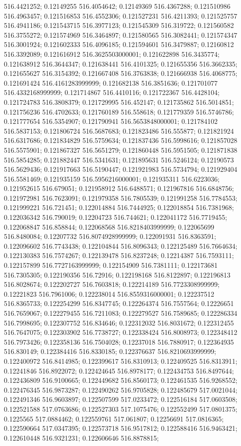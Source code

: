 516.4421252; 0.12149255 516.4054642; 0.12149369 516.4367288; 0.121510986 516.4963457; 0.121516853 516.4552306; 0.121527231 516.4211393; 0.121525757 516.4941186; 0.121543715 516.3977123; 0.121545309 516.319722; 0.121560582 516.3755272; 0.121574969 516.3464897; 0.121580565 516.3082441; 0.121574347 516.3001924; 0.121602333 516.4096185; 0.121594601 516.3479887; 0.12160812 516.3392089; 0.121616912 516.3625503000001; 0.121622898 516.3435774; 0.121638912 516.3644347; 0.121638441 516.4101325; 0.121655356 516.3662335; 0.121655627 516.3154392; 0.121667408 516.3763838; 0.121666938 516.4068775; 0.121691424 516.4161283999999; 0.121682138 516.3851636; 0.121701077 516.4332168999999; 0.121714867 516.4410116; 0.121722367 516.4428104; 0.121724783 516.3808379; 0.121729995 516.452147; 0.121735862 516.5014851; 0.121756236 516.4702633; 0.121760189 516.558618; 0.121779359 516.5746786; 0.121777654 516.5354907; 0.121790941 516.5653848000001; 0.121784102 516.5837153; 0.121806724 516.5687683; 0.121823486 516.555877; 0.121821924 516.6317686; 0.121834829 516.5759634; 0.121837436 516.5998616; 0.121857028 516.5575901; 0.121867327 516.5651279; 0.121860448 516.5951505; 0.121871838 516.5854285; 0.121882447 516.5341631; 0.121895631 516.5246124; 0.12190573 516.5629436; 0.121917663 516.5190447; 0.121921983 516.5734794; 0.121929404 516.5581469; 0.121935159 516.5956216000001; 0.121935311 516.6223036; 0.121952615 516.679051; 0.121958912 516.6488571; 0.121967816 516.6848756; 0.121972981 516.7623091; 0.121979358 516.7805539; 0.121991258 516.7784553; 0.121999221 516.721451; 0.122014884 516.7444925; 0.122018854 516.7381968; 0.122036342 516.790019; 0.12204723 516.744621; 0.122041172 516.7719455; 0.122068847 516.858844; 0.122068568 516.8218403999999; 0.122065699 516.8480084; 0.12207732 516.8074928999999; 0.122091931 516.8363591; 0.122096602 516.7743438; 0.122104844 516.8096343; 0.122125489 516.7664634; 0.122130383 516.7574267; 0.122139478 516.8237248; 0.12214387 516.7593111; 0.122157899 516.7727163999999; 0.122154909 516.7381111; 0.122173681 516.7305305; 0.122190356 516.72916; 0.122198168 516.8122897; 0.122196813 516.8028674; 0.122202727 516.7603818; 0.122214189 516.7723308999999; 0.12221823 516.7961006; 0.122238014 516.8559316000001; 0.122237512 516.8365733; 0.122254299 516.8347745; 0.122264374 516.7557564; 0.12226651 516.7659067; 0.122279455 516.7211083; 0.122279527 516.7589685; 0.122286334 516.7998695; 0.122307752 516.834646; 0.122312032 516.8031672; 0.122312455 516.7647075; 0.122303902 516.7738727; 0.122338424 516.8008973; 0.122348412 516.7973426; 0.122358136 516.7504028; 0.12237018 516.7880917; 0.122364935 516.830149; 0.122384416 516.8330185; 0.122376637 516.8210693999999; 0.122400972 516.8414985; 0.122399617 516.8310913; 0.122409525 516.8313911; 0.12241846 516.8922072; 0.122424645 516.8978177; 0.122434753 516.8497644; 0.122436809 516.9100665; 0.122449682 516.8560173; 0.122461535 516.9268552; 0.122476345 516.9873287; 0.122490262 516.9705828; 0.122485679 517.0021044; 0.122491346 516.9603897; 0.122507599 517.0233472; 0.122516184 517.0603508; 0.122521588 517.0763686; 0.122527303 517.1075476; 0.122552499 517.0801375; 0.1225565 517.0884462; 0.122559761 517.061807; 0.12256691 517.0816365; 0.122590664 517.0347395; 0.122573718 516.9517812; 0.122588416 516.9463421; 0.122610448 516.9321231; 0.122606646 516.8878815; 